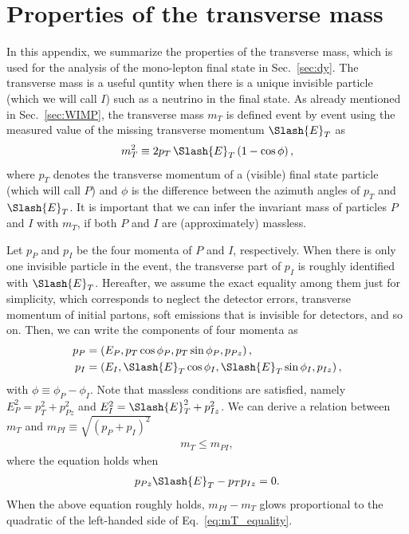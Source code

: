 \documentclass[12pt,twoside,book]{article}
\begin{document}
\section{Properties of the transverse mass}
\label{sec:susy}

In this appendix, we summarize the properties of the transverse mass, which is used for the analysis of the mono-lepton final state in Sec.~\ref{sec:dy}.
The transverse mass is a useful quntity when there is a unique invisible particle (which we will call $I$) such as a neutrino in the final state.
As already mentioned in Sec.~\ref{sec:WIMP}, the transverse mass $m_T$ is defined event by event using the measured value of the missing transverse momentum $\Slash{E}_{T}$ as
\begin{align}
  m_T^2 \equiv 2 p_T\,\Slash{E}_T \left( 1-\cos \phi \right),
\end{align}
where $p_T$ denotes the transverse momentum of a (visible) final state particle (which will call $P$) and $\phi$ is the difference between the azimuth angles of $p_T$ and $\Slash{E}_T$.
It is important that we can infer the invariant mass of particles $P$ and $I$ with $m_T$, if both $P$ and $I$ are (approximately) massless.

Let $p_P$ and $p_I$ be the four momenta of $P$ and $I$, respectively.
When there is only one invisible particle in the event, the transverse part of $p_I$ is roughly identified with $\Slash{E}_T$.
Hereafter, we assume the exact equality among them just for simplicity, which corresponds to neglect the detector errors, transverse momentum of initial partons, soft emissions that is invisible for detectors, and so on.
Then, we can write the components of four momenta as
\begin{align}
  p_P &= \left( E_P, p_T \cos\phi_P, p_T \sin\phi_P, p_{Pz} \right),\\
  p_I &= \left( E_I, \Slash{E}_T \cos\phi_I, \Slash{E}_T \sin\phi_I, p_{Iz} \right),
\end{align}
with $\phi \equiv \phi_P - \phi_I$.
Note that massless conditions are satisfied, namely $E_P^2 = p_T^2 + p_{Pz}^2$ and $E_I^2 = \Slash{E}_T^2 + p_{Iz}^2$.
We can derive a relation between $m_T$ and $m_{PI} \equiv \sqrt{(p_P + p_I)^2}$
\begin{align}
  m_T \leq m_{PI},
\end{align}
where the equation holds when
\begin{align}
  p_{Pz} \Slash{E}_T - p_T p_{Iz} = 0.
  \label{eq:mT_equality}
\end{align}
When the above equation roughly holds, $m_{PI} - m_T$ glows proportional to the quadratic of the left-handed side of Eq.~\eqref{eq:mT_equality}.
\end{document}
